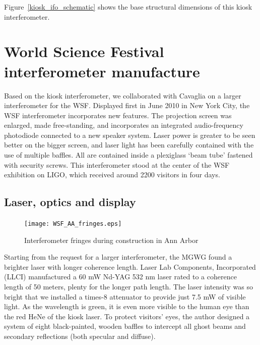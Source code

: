 Figure~\ref{kiosk_ifo_schematic} shows the base structural dimensions of this kiosk interferometer.


    \section{World Science Festival interferometer manufacture}
    \label{manufacture}

    
Based on the kiosk interferometer, we collaborated with Cavaglia on a larger interferometer for the WSF.
Displayed first in June 2010 in New York City, the WSF interferometer incorporates new features.
The projection screen was enlarged, made free-standing,
and incorporates an integrated audio-frequency photodiode connected to a new speaker system.
Laser power is greater to be seen better on the bigger screen, and
laser light has been carefully contained with the use of multiple baffles.
All are contained inside a plexiglass `beam tube' fastened with security screws.
This interferometer stood at the center of the WSF exhibition on LIGO, which received around 2200 visitors in four days.


        \subsection{Laser, optics and display}
        \label{laser_display}


	\begin{figure}
	\begin{center}
	\texttt{[image: WSF\_AA\_fringes.eps]}
	\caption{Interferometer fringes during construction in Ann Arbor}
	\label{WSF_AA_fringes}
	\end{center}
	\end{figure}

Starting from the request for a larger interferometer, the MGWG found a brighter laser with longer coherence length.
Laser Lab Components, Incorporated (LLCI) manufactured a 60 mW Nd-YAG 532 nm laser rated to a coherence length of 50 meters, plenty for the longer path length.
The laser intensity was so bright that we installed a times-8 attenuator to provide just 7.5 mW of visible light.
As the wavelength is green, it is even more visible to the human eye than the red HeNe of the kiosk laser.
To protect visitors' eyes, the author designed a system of eight black-painted, wooden baffles to intercept all ghost beams and secondary reflections (both specular and diffuse).

